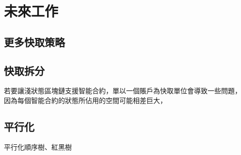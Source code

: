 \chapter{未來工作}
\label{c:future_work}

\section{更多快取策略}

\section{快取拆分}

若要讓淺狀態區塊鏈支援智能合約，單以一個賬戶為快取單位會導致一些問題，
因為每個智能合約的狀態所佔用的空間可能相差巨大，

\section{平行化}
平行化順序樹、紅黑樹